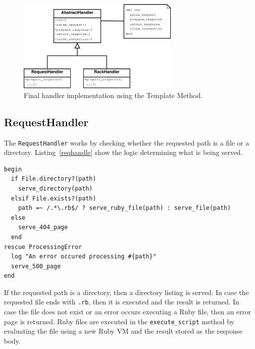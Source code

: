 \begin{figure}[htb]
  \centering
  \includegraphics[width=0.7\textwidth]{diagrams/handlers2.pdf}
  \caption{Final handler implementation using the Template Method.}
  \label{template2}
\end{figure}

\subsection{RequestHandler}
\label{reqhandler}
The \texttt{RequestHandler} works by checking whether the requested path is a
file or a directory. Listing~\ref{reqhandle} show the logic
determining what is being served.

\begin{lstlisting}[label=reqhandle,caption=\texttt{RequestHandler} logic.
(lib/yarn/request\_handler.rb:8)]
begin
  if File.directory?(path)
    serve_directory(path)
  elsif File.exists?(path)
    path =~ /.*\.rb$/ ? serve_ruby_file(path) : serve_file(path)
  else
    serve_404_page
  end
rescue ProcessingError
  log "An error occured processing #{path}"
  serve_500_page
end
\end{lstlisting}

If the requested path is a directory, then a directory listing is served. In
case the requested file ends with \texttt{.rb}, then it is executed and the
result is returned. In case the file does not exist or an error occurs
executing a Ruby file, then an error page is returned. Ruby files are executed
in the \texttt{execute\_script} method by evaluating the file using a new Ruby
VM and the result stored as the response body.


